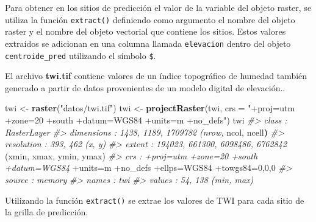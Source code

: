 \documentclass[11pt,b5paper,]{krantz}
\newenvironment{Shaded}{}{}
\newcommand{\CommentTok}[1]{\textcolor[rgb]{0.38,0.63,0.69}{\textit{#1}}}
\newcommand{\DataTypeTok}[1]{\textcolor[rgb]{0.56,0.13,0.00}{#1}}
\newcommand{\DecValTok}[1]{\textcolor[rgb]{0.25,0.63,0.44}{#1}}
\newcommand{\ErrorTok}[1]{\textcolor[rgb]{1.00,0.00,0.00}{\textbf{#1}}}
\newcommand{\KeywordTok}[1]{\textcolor[rgb]{0.00,0.44,0.13}{\textbf{#1}}}
\newcommand{\NormalTok}[1]{#1}
\newcommand{\OperatorTok}[1]{\textcolor[rgb]{0.40,0.40,0.40}{#1}}
\newcommand{\StringTok}[1]{\textcolor[rgb]{0.25,0.44,0.63}{#1}}
\begin{document}
Para obtener en los sitios de predicción el valor de la variable del objeto raster, se utiliza la función \texttt{extract()} definiendo como argumento el nombre del objeto raster y el nombre del objeto vectorial que contiene los sitios. Estos valores extraídos se adicionan en una columna llamada \texttt{elevacion} dentro del objeto \texttt{centroide\_pred} utilizando el símbolo \texttt{\$}.

\begin{Shaded}
\end{Shaded}

El archivo \textbf{twi.tif} contiene valores de un índice topográfico de humedad también generado a partir de datos provenientes de un modelo digital de elevación..

\begin{Shaded}
\begin{Highlighting}[]
\NormalTok{twi <-}\StringTok{ }\KeywordTok{raster}\NormalTok{(}\StringTok{"datos/twi.tif"}\NormalTok{)}
\NormalTok{twi <-}
\StringTok{  }\KeywordTok{projectRaster}\NormalTok{(twi, }
                \DataTypeTok{crs =} \StringTok{"+proj=utm +zone=20 +south}
\StringTok{                +datum=WGS84 +units=m +no_defs"}\NormalTok{)}
\NormalTok{twi}
\CommentTok{#> class : RasterLayer}
\CommentTok{#> dimensions : 1438, 1189, 1709782 (nrow,}
\NormalTok{ncol, ncell}\ErrorTok{)}
\CommentTok{#> resolution : 393, 462 (x, y)}
\CommentTok{#> extent : 194023, 661300, 6098486, 6762842}
\NormalTok{(xmin, xmax, ymin, ymax)}
\CommentTok{#> crs : +proj=utm +zone=20 +south +datum=WGS84}
\OperatorTok{+}\NormalTok{units=m }\OperatorTok{+}\NormalTok{no_defs }\OperatorTok{+}\NormalTok{ellps=WGS84 }\OperatorTok{+}\NormalTok{towgs84=}\DecValTok{0}\NormalTok{,}\DecValTok{0}\NormalTok{,}\DecValTok{0}
\CommentTok{#> source : memory}
\CommentTok{#> names : twi}
\CommentTok{#> values : 54, 138 (min, max)}
\end{Highlighting}
\end{Shaded}

Utilizando la función \texttt{extract()} se extrae los valores de TWI para cada sitio de la grilla de predicción.

\begin{Shaded}
\end{Shaded}
\end{document}
